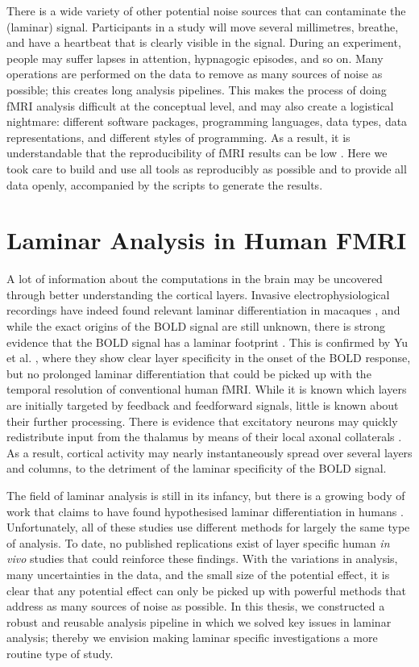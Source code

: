 There is a wide variety of other potential noise sources that can contaminate the (laminar) signal. Participants in a study will move several millimetres, breathe, and have a heartbeat that is clearly visible in the signal. During an experiment, people may suffer lapses in attention, hypnagogic episodes, and so on. Many operations are performed on the data to remove as many sources of noise as possible; this creates long analysis pipelines. This makes the process of doing fMRI analysis difficult at the conceptual level, and may also create a logistical nightmare: different software packages, programming languages, data types, data representations, and different styles of programming. As a result, it is understandable that the reproducibility of fMRI results can be low \cite{Nosek2015,Gorgolewski2016a}. Here we took care to build and use all tools as reproducibly as possible and to provide all data openly, accompanied by the scripts to generate the results.

\section{Laminar Analysis in Human FMRI}
A lot of information about the computations in the brain may be uncovered through better understanding the cortical layers. Invasive electrophysiological recordings have indeed found relevant laminar differentiation in macaques \cite{Buffalo2011,Maier2010,Maier2011,VanKerkoerle2017}, and while the exact origins of the BOLD signal are still unknown, there is strong evidence that the BOLD signal has a laminar footprint \cite{Goense2006}. This is confirmed by Yu et al. \cite{Yu2014}, where they show clear layer specificity in the onset of the BOLD response, but no prolonged laminar differentiation that could be picked up with the temporal resolution of conventional human fMRI. While it is known which layers are initially targeted by feedback and feedforward signals, little is known about their further processing. There is evidence that excitatory neurons may quickly redistribute input from the thalamus by means of their local axonal collaterals \cite{Guy2017,ReyesPuerta2015}. As a result, cortical activity may nearly instantaneously spread over several layers and columns, to the detriment of the laminar specificity of the BOLD signal.

The field of laminar analysis is still in its infancy, but there is a growing body of work that claims to have found hypothesised laminar differentiation in humans \cite{Maass2014,Muckli2015,Scheeringa2016,Kok2016,Huber2017}. Unfortunately, all of these studies use different methods for largely the same type of analysis. To date, no published replications exist of layer specific human \emph{in vivo} studies that could reinforce these findings. With the variations in analysis, many uncertainties in the data, and the small size of the potential effect, it is clear that any potential effect can only be picked up with powerful methods that address as many sources of noise as possible. In this thesis, we constructed a robust and reusable analysis pipeline in which we solved key issues in laminar analysis; thereby we envision making laminar specific investigations a more routine type of study.

